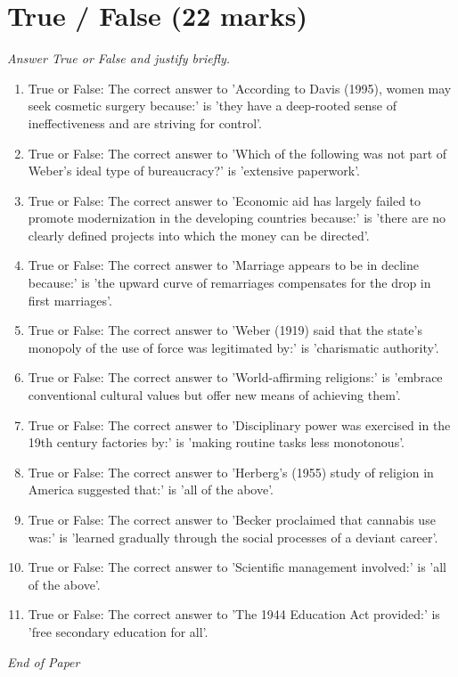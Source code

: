 \documentclass[12pt]{article}
\begin{document}
\section*{True / False (22 marks)}
\textit{Answer True or False and justify briefly.}
\begin{enumerate}[label=\arabic*.]
\item True or False: The correct answer to 'According to Davis (1995), women may seek cosmetic surgery because:' is 'they have a deep-rooted sense of ineffectiveness and are striving for control'.
\item True or False: The correct answer to 'Which of the following was not part of Weber's ideal type of bureaucracy?' is 'extensive paperwork'.
\item True or False: The correct answer to 'Economic aid has largely failed to promote modernization in the developing countries because:' is 'there are no clearly defined projects into which the money can be directed'.
\item True or False: The correct answer to 'Marriage appears to be in decline because:' is 'the upward curve of remarriages compensates for the drop in first marriages'.
\item True or False: The correct answer to 'Weber (1919) said that the state's monopoly of the use of force was legitimated by:' is 'charismatic authority'.
\item True or False: The correct answer to 'World-affirming religions:' is 'embrace conventional cultural values but offer new means of achieving them'.
\item True or False: The correct answer to 'Disciplinary power was exercised in the 19th century factories by:' is 'making routine tasks less monotonous'.
\item True or False: The correct answer to 'Herberg's (1955) study of religion in America suggested that:' is 'all of the above'.
\item True or False: The correct answer to 'Becker proclaimed that cannabis use was:' is 'learned gradually through the social processes of a deviant career'.
\item True or False: The correct answer to 'Scientific management involved:' is 'all of the above'.
\item True or False: The correct answer to 'The 1944 Education Act provided:' is 'free secondary education for all'.
\end{enumerate}

\vfill
\noindent\textit{End of Paper}
\end{document}
